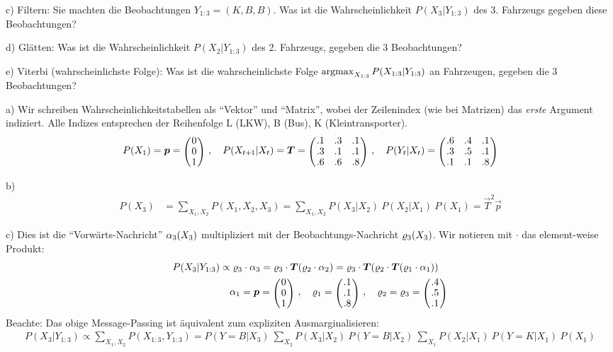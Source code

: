 c) Filtern: Sie machten die Beobachtungen $Y_{1:3}=(K, B,
B)$. Was ist die Wahrscheinlichkeit $P(X_3|Y_{1:3})$ des 3. Fahrzeugs
gegeben diese Beobachtungen?

d) Glätten: Was ist die Wahrscheinlichkeit $P(X_2|Y_{1:3})$ des 2. Fahrzeugs,
gegeben die 3 Beobachtungen?

e) Viterbi (wahrscheinlichste Folge): Was ist die wahrscheinlichste
Folge $\operatorname*{argmax}_{X_{1:3}} P(X_{1:3}|Y_{1:3})$ an Fahrzeugen, gegeben
  die 3 Beobachtungen?

\begin{solution}
a) Wir schreiben Wahrscheinlichkeitstabellen als ``Vektor'' und
``Matrix'', wobei der Zeilenindex (wie bei Matrizen) das \emph{erste}
Argument indiziert. Alle Indizes entsprechen der Reihenfolge L (LKW),
B (Bus), K (Kleintransporter).
\begin{align}
P(X_1) = \vec p = \mat{c}{ 0 \\ 0 \\ 1} \comma
P(X_{t\po}|X_t) = \vec T = \mat{ccc}{
.1 & .3 & .1 \\
.3 & .1 & .1 \\
.6 & .6 & .8 }\comma
P(Y_t|X_t) = \mat{ccc}{
.6 & .4 & .1 \\
.3 & .5 & .1 \\
.1 & .1 & .8 }
\end{align}

b)
\begin{align}
P(X_3)
&= \sum_{X_1,X_2} P(X_1,X_2,X_3)
 = \sum_{X_1,X_2} P(X_3|X_2)~ P(X_2|X_1)~ P(X_1) = \vec T^2 \vec p
\end{align}

c) Dies ist die ``Vorwärts-Nachricht'' $\alpha_3(X_3)$ multipliziert mit der
Beobachtungs-Nachricht $\varrho_3(X_3)$. Wir notieren mit $\cdot$ 
das element-weise Produkt:
\begin{align}
P(X_3|Y_{1:3})
&\propto \r_3 \cdot \a_3
= \r_3 \cdot \vec T (\r_2 \cdot \a_2)
= \r_3 \cdot \vec T (\r_2 \cdot \vec T(\r_1 \cdot \a_1))\\
&\quad \a_1 = \vec p = \mat{c}{ 0 \\ 0 \\ 1} \comma
\r_1 = \mat{c}{ .1 \\ .1 \\ .8} \comma
\r_2 = \r_3 = \mat{c}{ .4 \\ .5 \\ .1}
\end{align}
Beachte: Das obige Message-Passing ist äquivalent zum
expliziten Ausmarginalisieren:
\begin{align}
P(X_3|Y_{1:3})
\propto \sum_{X_1, X_2} P(X_{1:3},Y_{1:3})
= P(Y=B|X_3)~ \sum_{X_2} P(X_3|X_2)~ P(Y=B|X_2)~ \sum_{X_1} P(X_2|X_1)~ P(Y=K|X_1)~ P(X_1)
\end{align}



\end{solution}
